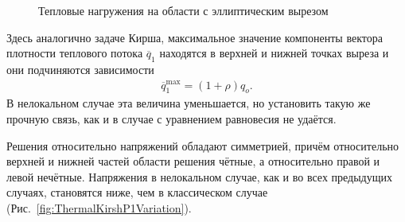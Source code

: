 \begin{figure}[ht]
    \caption{Тепловые нагружения на области с эллиптическим вырезом}
    \label{fig:ThermalKirshProblem}
\end{figure}

Здесь аналогично задаче Кирша, максимальное значение компоненты вектора плотности теплового потока $\overline{q}_1$ находятся в верхней и нижней точках выреза и они подчиняются зависимости
\begin{gather*}
	\overline{q}_1^{\max} = (1 + \rho) q_o.
\end{gather*}
В нелокальном случае эта величина уменьшается, но установить такую же прочную связь, как и в случае с уравнением равновесия не удаётся.

Решения относительно напряжений обладают симметрией, причём относительно верхней и нижней частей области решения чётные, а относительно правой и левой нечётные. Напряжения в нелокальном случае, как и во всех предыдущих случаях, становятся ниже, чем в классическом случае (Рис.~\ref{fig:ThermalKirshP1Variation}).

